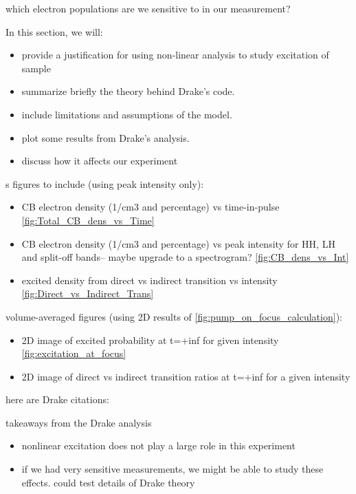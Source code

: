 which electron populations are we sensitive to in our measurement?

In this section, we will:
\begin{itemize}
\item provide a justification for using non-linear analysis to study excitation of sample
\item summarize briefly the theory behind Drake's code.
\item include limitations and assumptions of the model.
\item plot some results from Drake's analysis.
\item discuss how it affects our experiment
\end{itemize}
s
figures to include (using peak intensity only):
\begin{itemize}
\item CB electron density (1/cm3 and percentage) vs time-in-pulse \cref{fig:Total_CB_dens_vs_Time}
\item CB electron density (1/cm3 and percentage) vs peak intensity for HH, LH and split-off bands-- maybe upgrade to a spectrogram? \cref{fig:CB_dens_vs_Int}
\item excited density from direct vs indirect transition vs intensity \cref{fig:Direct_vs_Indirect_Trans}
\end{itemize}

volume-averaged figures (using 2D results of \cref{fig:pump_on_focus_calculation}):
\begin{itemize}
\item 2D image of excited probability at t=+inf for given intensity \cref{fig:excitation_at_focus}
\item 2D image of direct vs indirect transition ratios at t=+inf for a given intensity
\end{itemize}

here are Drake citations: \cite{austinSemiconductorSurfaceModification2017,wernerSingleShotMultiStageDamage2019,sergaevaUltrafastExcitationConductionband2018,austinFemtosecondLaserDamage2018}

takeaways from the Drake analysis
\begin{itemize}
	\item nonlinear excitation does not play a large role in this experiment
	\item if we had very sensitive measurements, we might be able to study these effects. could test details of Drake theory
\end{itemize}


